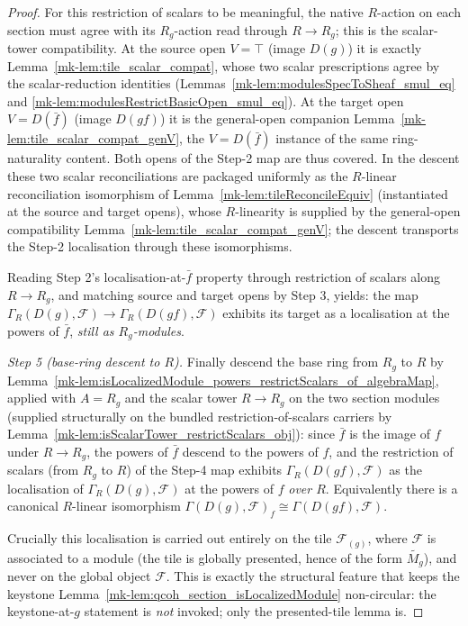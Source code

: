 \begin{proof}
  For this restriction of scalars to be meaningful, the native \(R\)-action on each section must agree
  with its \(R_g\)-action read through \(R \to R_g\); this is the scalar-tower compatibility. At the
  source open \(V = \top\) (image \(D(g)\)) it is exactly Lemma~\ref{mk-lem:tile_scalar_compat}, whose two
  scalar prescriptions agree by the scalar-reduction identities
  (Lemmas~\ref{mk-lem:modulesSpecToSheaf_smul_eq} and \ref{mk-lem:modulesRestrictBasicOpen_smul_eq}). At the
  target open \(V = D(\bar f)\) (image \(D(gf)\)) it is the general-open companion
  Lemma~\ref{mk-lem:tile_scalar_compat_genV}, the \(V = D(\bar f)\) instance of the same ring-naturality
  content. Both opens of the Step-2 map are thus covered. In the descent these two scalar
  reconciliations are packaged uniformly as the \(R\)-linear reconciliation isomorphism of
  Lemma~\ref{mk-lem:tileReconcileEquiv} (instantiated at the source and target opens), whose
  \(R\)-linearity is supplied by the general-open compatibility Lemma~\ref{mk-lem:tile_scalar_compat_genV};
  the descent transports the Step-2 localisation through these isomorphisms.

  Reading Step 2's localisation-at-\(\bar f\) property through restriction of scalars along
  \(R \to R_g\), and matching source and target opens by Step 3, yields: the map
  \(\Gamma_R(D(g), \mathcal{F}) \to \Gamma_R(D(gf), \mathcal{F})\) exhibits its target as a localisation
  at the powers of \(\bar f\), \emph{still as \(R_g\)-modules}.

  \emph{Step 5 (base-ring descent to \(R\)).} Finally descend the base ring from \(R_g\) to \(R\) by
  Lemma~\ref{mk-lem:isLocalizedModule_powers_restrictScalars_of_algebraMap}, applied with \(A = R_g\) and the
  scalar tower \(R \to R_g\) on the two section modules (supplied structurally on the bundled
  restriction-of-scalars carriers by Lemma~\ref{mk-lem:isScalarTower_restrictScalars_obj}): since \(\bar f\) is the image of \(f\) under
  \(R \to R_g\), the powers of \(\bar f\) descend to the powers of \(f\), and the restriction of scalars
  (from \(R_g\) to \(R\)) of the Step-4 map exhibits \(\Gamma_R(D(gf), \mathcal{F})\) as the localisation
  of \(\Gamma_R(D(g), \mathcal{F})\) at the powers of \(f\) \emph{over \(R\)}. Equivalently there is a
  canonical \(R\)-linear isomorphism \(\Gamma(D(g), \mathcal{F})_f \cong \Gamma(D(gf), \mathcal{F})\).

  Crucially this localisation is carried out entirely on the tile \(\mathcal{F}_{(g)}\), where
  \(\mathcal{F}\) is associated to a module (the tile is globally presented, hence of the form
  \(\widetilde{M_g}\)), and never on
  the global object \(\mathcal{F}\). This is exactly the structural feature that keeps the keystone
  Lemma~\ref{mk-lem:qcoh_section_isLocalizedModule} non-circular: the keystone-at-\(g\) statement is
  \emph{not} invoked; only the presented-tile lemma is.
\end{proof}

